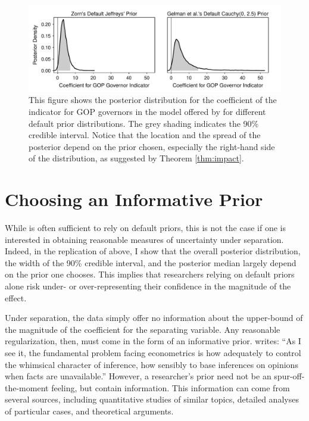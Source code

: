 \documentclass[12pt]{article}
\begin{document}
\begin{figure}[H]
\begin{center}
\includegraphics[scale = .8]{figs/br-posterior-density-illustrate-importance.pdf}
\caption{This figure shows the posterior distribution for the coefficient of the indicator for GOP governors in the model offered by \cite{BarrilleauxRainey2014} for different default prior distributions. The grey shading indicates the 90\% credible interval. Notice that the location and the spread of the posterior depend on the prior chosen, especially the right-hand side of the distribution, as suggested by Theorem \ref{thm:impact}.}\label{fig:bf-posterior-density-illustrate-importance}
\end{center}
\end{figure}

\section*{Choosing an Informative Prior}

While is often sufficient to rely on default priors, this is not the case if one is interested in obtaining reasonable measures of uncertainty under separation. Indeed, in the replication of \cite{BarrilleauxRainey2014} above, I show that the overall posterior distribution, the width of the 90\% credible interval, and the posterior median largely depend on the prior one chooses. This implies that researchers relying on default priors alone risk under- or over-representing their confidence in the magnitude of the effect.

Under separation, the data simply offer no information about the upper-bound of the magnitude of the coefficient for the separating variable. Any reasonable regularization, then, must come in the form of an informative prior. \citet[p. 38]{Leamer1983} writes: ``As I see it, the fundamental problem facing econometrics is how adequately to control the whimsical character of inference, how sensibly to base inferences on opinions when facts are unavailable.'' However, a researcher's prior need not be an spur-off-the-moment feeling, but contain information. This information can come from several sources, including quantitative studies of similar topics, detailed analyses of particular cases, and theoretical arguments.
\end{document}
